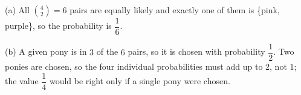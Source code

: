 (a) All $\binom42=6$ pairs are equally likely and exactly one of them is \{pink, purple\}, so the probability is $\boxed{\dfrac16}$.

(b) A given pony is in $3$ of the $6$ pairs, so it is chosen with probability $\boxed{\dfrac12}$. Two ponies are chosen, so the four individual probabilities must add up to $2$, not $1$; the value $\dfrac14$ would be right only if a single pony were chosen.
